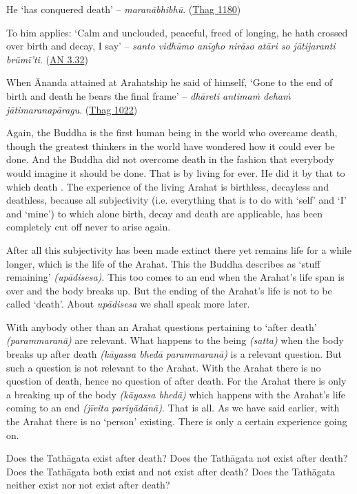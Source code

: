 He `has conquered death' -- \emph{maranābhibhū}. (\href{https://suttacentral.net/thag20.1/en/sujato}{Thag 1180})

To him applies: `Calm and unclouded, peaceful, freed of longing, he hath crossed over birth and decay, I say' -- \emph{santo vidhūmo anīgho nirāso atāri so jātijaranti brūmī'ti}. (\href{https://suttacentral.net/an3.32/en/bodhi}{AN 3.32})

When Ānanda attained at Arahatship he said of himself, `Gone to the end of birth and death he bears the final frame' -- \emph{dhāreti antimaṁ dehaṁ jātimaranapāragu}. (\href{https://suttacentral.net/thag17.3/en/sujato}{Thag 1022})

Again, the Buddha is the first human being in the world who overcame death, though the greatest thinkers in the world have wondered how it could ever be done. And the Buddha did not overcome death in the fashion that everybody would imagine it should be done. That is by living for ever. He did it by  that to which death . The experience of the living Arahat is birthless, decayless and deathless, because all subjectivity (i.e. everything that is to do with `self' and `I' and `mine') to which alone birth, decay and death are applicable, has been completely cut off never to arise again.

After all this subjectivity has been made extinct there yet remains life for a while longer, which is the life of the Arahat. This the Buddha describes as `stuff remaining' \emph{(upādisesa)}. This too comes to an end when the Arahat's life span is over and the body breaks up. But the ending of the Arahat's life is not to be called `death'. About \emph{upādisesa} we shall speak more later.

With anybody other than an Arahat questions pertaining to `after death' \emph{(parammaranā)} are relevant. What happens to the being \emph{(satta)} when the body breaks up after death \emph{(kāyassa bhedā parammaranā)} is a relevant question. But such a question is not relevant to the Arahat. With the Arahat there is no question of death, hence no question of after death. For the Arahat there is only a breaking up of the body \emph{(kāyassa bhedā)} which happens with the Arahat's life coming to an end \emph{(jīvita pariyādānā)}. That is all. As we have said earlier, with the Arahat there is no `person' existing. There is only a certain experience going on.

Does the Tathāgata exist after death? Does the Tathāgata not exist after death? Does the Tathāgata both exist and not exist after death? Does the Tathāgata neither exist nor not exist after death?

